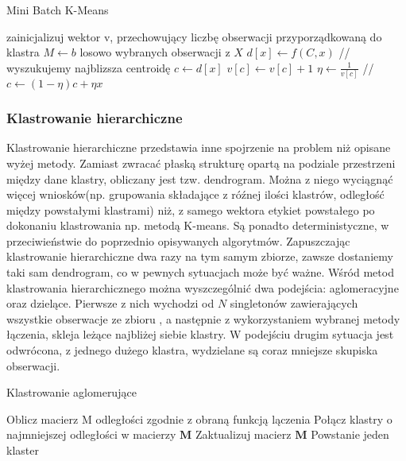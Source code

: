 \documentclass{article}
\begin{document}
\begin{algorithm}
\label{batch_k_means}
\caption{Mini Batch K-Means}
\begin{algorithmic}[1]
\STATE zainicjalizuj wektor v, przechowujący liczbę obserwacji przyporządkowaną do 
klastra
	\STATE $M \leftarrow b$ losowo wybranych obserwacji z $X$
		\STATE $d[x] \leftarrow f(C,x)$ // wyszukujemy najblizsza centroidę
	\ENDFOR
		\STATE $c \leftarrow d[x]$
		\STATE $v[c] \leftarrow v[c] + 1$
		\STATE $\eta \leftarrow \frac{1}{v[c]}$ // 
		\STATE $c \leftarrow (1 - \eta)c + \eta x$ 
	\ENDFOR
\ENDFOR
\end{algorithmic}
\end{algorithm}

\subsubsection{Klastrowanie hierarchiczne}
Klastrowanie hierarchiczne przedstawia inne spojrzenie na problem niż opisane wyżej metody. Zamiast zwracać płaską strukturę opartą na podziale przestrzeni między dane klastry, obliczany jest tzw. dendrogram. 
Można z niego wyciągnąć więcej wniosków(np. grupowania składające z róźnej ilości klastrów, odległość między powstałymi klastrami)  niż, z samego wektora etykiet powstałego po dokonaniu klastrowania np. metodą K-means.
Są ponadto deterministyczne, w przeciwieństwie do poprzednio opisywanych algorytmów.
Zapuszczając klastrowanie hierarchiczne dwa razy na tym samym zbiorze, zawsze dostaniemy taki sam dendrogram, co w pewnych sytuacjach może być ważne.
Wśród metod klastrowania hierarchicznego można wyszczególnić dwa podejścia: aglomeracyjne oraz dzielące.
Pierwsze z nich wychodzi od $N$ singletonów zawierających wszystkie obserwacje ze zbioru , a następnie z wykorzystaniem wybranej metody łączenia, skleja leżące najbliżej siebie klastry. 
W podejściu drugim sytuacja jest odwrócona, z jednego dużego klastra, wydzielane są coraz mniejsze skupiska obserwacji\citep{Jain1988}.


\begin{algorithm}
\label{agglomerative}
\caption{Klastrowanie aglomerujące}
\begin{algorithmic}[1]
\STATE Oblicz macierz M odległości zgodnie z obraną funkcją lączenia
\REPEAT
\STATE Połącz klastry o najmniejszej odległości w macierzy $\textbf{M}$ 
\STATE Zaktualizuj macierz $\textbf{M}$ 
\UNTIL Powstanie jeden klaster
\end{algorithmic}
\end{algorithm}
\end{document}

